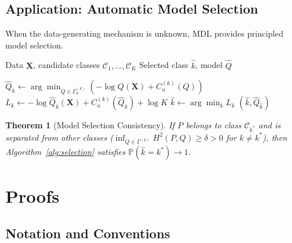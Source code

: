 \documentclass[preprint,review,12pt]{article}
\newtheorem{theorem}{Theorem}[section]
\begin{document}
\subsection{Application: Automatic Model Selection}
\label{subsec:model_selection}

When the data-generating mechanism is unknown, MDL provides principled 
model selection.

\begin{algorithm}[t]
\caption{Automatic Model Class Selection}
\label{alg:selection}
\begin{algorithmic}[1]
	\REQUIRE Data $\mathbf{X}$, candidate classes $\mathcal{C}_1, \ldots, \mathcal{C}_K$
	\ENSURE Selected class $\hat{k}$, model $\hat{Q}$
	
	\STATE $\hat{Q}_k \leftarrow \arg\min_{Q \in \Gamma_n^{(k)}} 
	(-\log Q(\mathbf{X}) + C_n^{(k)}(Q))$
	\STATE $L_k \leftarrow -\log \hat{Q}_k(\mathbf{X}) + C_n^{(k)}(\hat{Q}_k) + \log K$
	\ENDFOR
	\STATE $\hat{k} \leftarrow \arg\min_k L_k$
	\RETURN $(\hat{k}, \hat{Q}_{\hat{k}})$
\end{algorithmic}
\end{algorithm}

\begin{theorem}[Model Selection Consistency]\label{thm:selection}
If $P$ belongs to class $\mathcal{C}_{k^*}$ and is separated from other 
classes ($\inf_{Q \in \Gamma^{(k)}} H^2(P, Q) \geq \delta > 0$ for 
$k \neq k^*$), then Algorithm~\ref{alg:selection} satisfies 
$\mathbb{P}(\hat{k} = k^*) \to 1$.
\end{theorem}

\section{Proofs}
\label{sec:proofs}

\subsection{Notation and Conventions}
\end{document}
